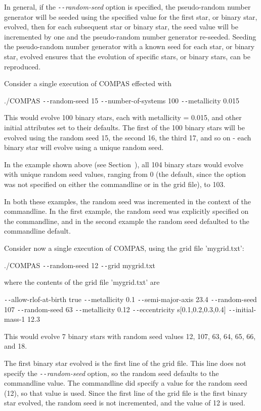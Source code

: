In general, if the \textit{\texttt{-{}-}random-seed} option is specified, the pseudo-random number generator will be seeded using the specified value for the first star, or binary star, evolved, then for each subsequent star or binary star, the seed value will be incremented by one and the pseudo-random number generator re-seeded. Seeding the pseudo-random number generator with a known seed for each star, or binary star, evolved ensures that the evolution of specific stars, or binary stars, can be reproduced.

Consider a single execution of COMPAS effected with

\tabto{3em}./COMPAS \texttt{-{}-}random-seed 15 \texttt{-{}-}number-of-systems 100 \texttt{-{}-}metallicity 0.015

\bigskip
This would evolve 100 binary stars, each with metallicity = 0.015, and other initial attributes set to their defaults. The first of the 100 binary stars will be evolved using the random seed 15, the second 16, the third 17, and so on - each binary star will evolve using a unique random seed.

In the example shown above (see Section~), all 104 binary stars would evolve with unique random seed values, ranging from 0 (the default, since the option was not specified on either the commandline or in the grid file), to 103.

In both these examples, the random seed was incremented in the context of the commandline.  In the first example, the random seed was explicitly specified on the commandline, and in the second example the random seed defaulted to the commandline default.

Consider now a single execution of COMPAS, using the grid file 'mygrid.txt':

\tabto{3em}./COMPAS \texttt{-{}-}random-seed 12 \texttt{-{}-}grid mygrid.txt

\bigskip
where the contents of the grid file 'mygrid.txt' are

\tabto{3em}\texttt{-{}-}allow-rlof-at-birth true \texttt{-{}-}metallicity 0.1
\tabto{3em}\texttt{-{}-}semi-major-axis 23.4 \texttt{-{}-}random-seed 107
\tabto{3em}\texttt{-{}-}random-seed 63 \texttt{-{}-}metallicity 0.12 \texttt{-{}-}eccentricity s[0.1,0.2,0.3,0.4]
\tabto{3em}\texttt{-{}-}initial-mass-1 12.3

\bigskip
This would evolve 7 binary stars with random seed values 12, 107, 63, 64, 65, 66, and 18.

The first binary star evolved is the first line of the grid file. This line does not specify the \textit{\texttt{-{}-}random-seed} option, so the random seed defaults to the commandline value. The commandline did specify a value for the random seed (12), so that value is used. Since the first line of the grid file is the first binary star evolved, the random seed is not incremented, and the value of 12 is used.

